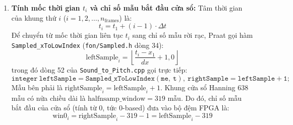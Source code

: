 \begin{enumerate}[leftmargin=1.5em, itemsep=3pt]
    \item \textbf{Tính mốc thời gian $t_i$ và chỉ số mẫu bắt đầu cửa sổ:}
    Tâm thời gian của khung thứ $i$ ($i = 1, 2, \dots, n_{\text{frames}}$) là:
    \begin{equation}
    t_i = t_1 + (i - 1) \cdot \Delta t
    \end{equation}
    Để chuyển từ mốc thời gian liên tục $t_i$ sang chỉ số mẫu rời rạc, Praat gọi hàm \texttt{Sampled\_xToLowIndex} (\texttt{fon/Sampled.h} dòng 34):
    \begin{equation}
    \text{leftSample}_i = \left\lfloor \frac{t_i - x_1}{dx} + 1{,}0 \right\rfloor
    \end{equation}
    trong đó dòng 52 của \texttt{Sound\_to\_Pitch.cpp} gọi trực tiếp:
    \begin{equation}
    \mathtt{integer\ leftSample = Sampled\_xToLowIndex(me,\ t),\ rightSample = leftSample + 1;}
    \end{equation}
    Mẫu bên phải là $\text{rightSample}_i = \text{leftSample}_i + 1$. Khung cửa sổ Hanning 638 mẫu có nửa chiều dài là $\text{halfnsamp\_window} = 319$ mẫu. Do đó, chỉ số mẫu bắt đầu của cửa sổ (tính từ 0, tức 0-based) đưa vào bộ đệm FPGA là:
    \begin{equation}
    \text{win0}_i = \text{rightSample}_i - 319 - 1 = \text{leftSample}_i - 319
    \end{equation}
\end{enumerate}

